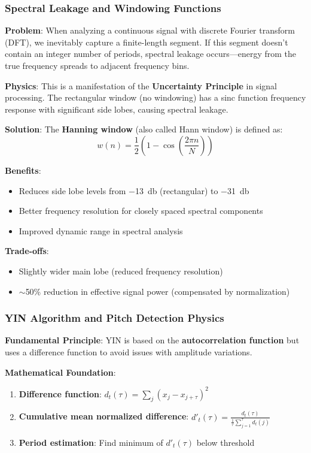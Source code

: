 \documentclass[11pt,a4paper]{article}
\begin{document}
\subsubsection{Spectral Leakage and Windowing Functions}

\textbf{Problem}: When analyzing a continuous signal with discrete Fourier transform (DFT), we inevitably capture a finite-length segment. If this segment doesn't contain an integer number of periods, spectral leakage occurs---energy from the true frequency spreads to adjacent frequency bins.

\textbf{Physics}: This is a manifestation of the \textbf{Uncertainty Principle} in signal processing. The rectangular window (no windowing) has a sinc function frequency response with significant side lobes, causing spectral leakage.

\textbf{Solution}: The \textbf{Hanning window} (also called Hann window) is defined as:
\begin{equation}
w(n) = \frac{1}{2}\left(1 - \cos\left(\frac{2\pi n}{N}\right)\right)
\end{equation}

\textbf{Benefits}:
\begin{itemize}
    \item Reduces side lobe levels from \SI{-13}{\decibel} (rectangular) to \SI{-31}{\decibel}
    \item Better frequency resolution for closely spaced spectral components
    \item Improved dynamic range in spectral analysis
\end{itemize}

\textbf{Trade-offs}:
\begin{itemize}
    \item Slightly wider main lobe (reduced frequency resolution)
    \item $\sim$50\% reduction in effective signal power (compensated by normalization)
\end{itemize}

\subsubsection{YIN Algorithm and Pitch Detection Physics}

\textbf{Fundamental Principle}: YIN is based on the \textbf{autocorrelation function} but uses a difference function to avoid issues with amplitude variations.

\textbf{Mathematical Foundation}:
\begin{enumerate}
    \item \textbf{Difference function}: $d_t(\tau) = \sum_{j} (x_j - x_{j+\tau})^2$
    \item \textbf{Cumulative mean normalized difference}: $d'_t(\tau) = \frac{d_t(\tau)}{\frac{1}{\tau} \sum_{j=1}^{\tau} d_t(j)}$
    \item \textbf{Period estimation}: Find minimum of $d'_t(\tau)$ below threshold
\end{enumerate}
\end{document}

